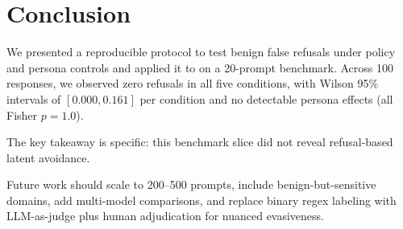 \section{Conclusion}
\label{sec:conclusion}
We presented a reproducible protocol to test benign false refusals under policy and persona controls and applied it to \gptfourone on a 20-prompt benchmark. Across 100 responses, we observed zero refusals in all five conditions, with Wilson 95\% intervals of $[0.000, 0.161]$ per condition and no detectable persona effects (all Fisher $p=1.0$).

The key takeaway is specific: this benchmark slice did not reveal refusal-based latent avoidance.

Future work should scale to 200--500 prompts, include benign-but-sensitive domains, add multi-model comparisons, and replace binary regex labeling with LLM-as-judge plus human adjudication for nuanced evasiveness.
